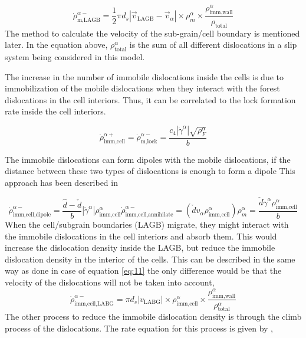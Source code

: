 \documentclass[a4paper,11pt]{article}
\begin{document}
% 
\begin{equation}
\dot\rho_{\text{m,LAGB}}^{\alpha-} = \frac{1}{2} \pi d_s \left|\overrightarrow{v}_\text{LAGB} - \overrightarrow{v}_\alpha \right| \times \rho_m^\alpha \times \frac{\rho_{\text{imm,wall}}^\alpha}{\rho_{\text{total}}} \label{eq:11}
\end{equation}
%
The method to calculate the velocity of the sub-grain/cell boundary is mentioned later. 
In the equation above, \begin{math} \rho_{\text{total}}^\alpha \end{math} is the sum of all different dislocations in a slip system being considered in this model. 

%
The increase in the number of immobile dislocations inside the cells is due to immobilization of the mobile dislocations when they interact with the forest dislocations in the cell interiors. 
Thus, it can be correlated to the lock formation rate inside the cell interiors.

%
\begin{equation}
\dot\rho_{\text{imm,cell}}^{\alpha+} = \dot\rho_{\text{m,lock}}^{\alpha-} = \frac{c_4 \left|\dot\gamma^\alpha\right| \sqrt{\rho_F^\alpha}}{b} \label{eq:12}
\end{equation}

%
The immobile dislocations can form dipoles with the mobile dislocations, if the distance between these two types of dislocations is enough to form a dipole 
This approach has been described in \cite{Roters2011}

\begin{subequations}
\begin{equation}
\dot\rho_{\text{imm,cell,dipole}}^{\alpha-} = \frac{\hat{d} - \check{d}}{b} \left|\dot\gamma^\alpha\right| \rho_{\text{imm,cell}}^{\alpha} \label{eq:13}
\end{equation}

\begin{equation}
\dot\rho_{\text{imm,cell,annihilate}}^{\alpha-} = \left(\check{d} v_\alpha \rho_{\text{imm,cell}}^\alpha \right) \rho_m^\alpha = \frac{\check{d} \dot\gamma^\alpha \rho_{\text{imm,cell}}^\alpha}{b} \label{eq:13_1}
\end{equation}
\end{subequations}
%
When the cell/subgrain boundaries (LAGB) migrate, they might interact with the immobile dislocations in the cell interiors and absorb them. 
This would increase the dislocation density inside the LAGB, but reduce the immobile dislocation density in the interior of the cells. 
This can be described in the same way as done in case of equation \eqref{eq:11}
the only difference would be that the velocity of the dislocations will not be taken into account,
%
\begin{equation}
\dot\rho_{\text{imm,cell,LABG}}^{\alpha-} = \pi d_s \left| v_{\text{LABG}} \right| \times \rho_{\text{imm,cell}}^{\alpha} \times \frac{\rho_{\text{imm,wall}}^{\alpha}}{\rho_{\text{total}}^{\alpha}} \label{eq:14}
\end{equation}
%
The other process to reduce the immobile dislocation density is through the climb process of the dislocations. 
The rate equation for this process is given by \cite{Roters2000} ,
\end{document}
